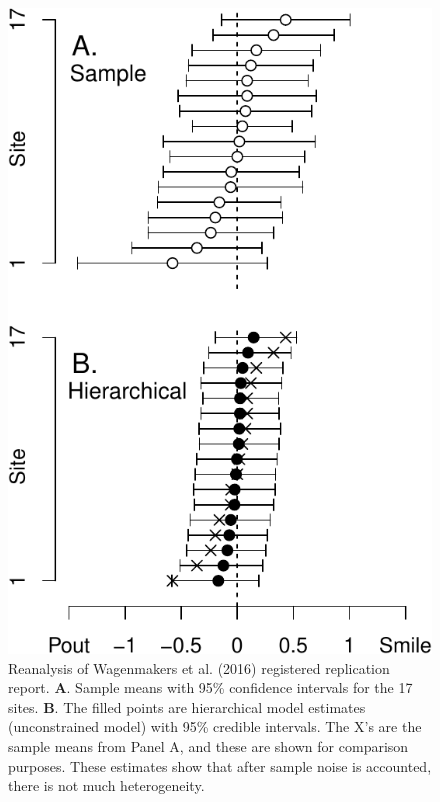\documentclass[english,man]{apa6}
\theoremstyle{definition}
\theoremstyle{definition}
\theoremstyle{definition}
\theoremstyle{remark}
\begin{document}
\begin{figure}[htbp]
\centering
\includegraphics{p_files/figure-latex/wagEst-1.pdf}
\caption{\label{fig:wagEst}Reanalysis of Wagenmakers et al. (2016)
registered replication report. \textbf{A}. Sample means with 95\%
confidence intervals for the 17 sites. \textbf{B}. The filled points are
hierarchical model estimates (unconstrained model) with 95\% credible
intervals. The X's are the sample means from Panel A, and these are
shown for comparison purposes. These estimates show that after sample
noise is accounted, there is not much heterogeneity.}
\end{figure}
\end{document}
